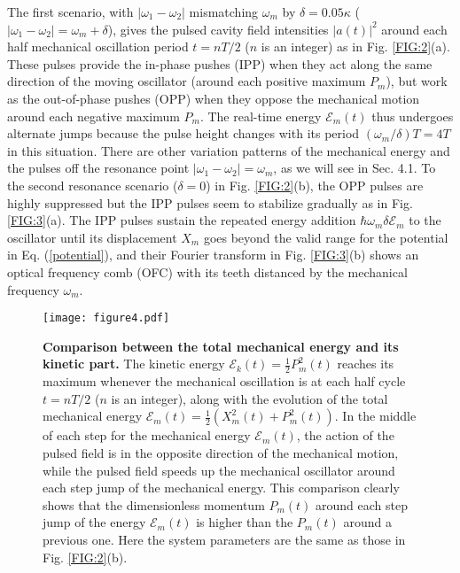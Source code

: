 \documentclass[a4paper,fleqn]{cas-dc}
\begin{document}
The first scenario, with $|\omega_1-\omega_2|$ mismatching $\omega_m$ by $\delta=0.05\kappa$ ($|\omega_1-\omega_2|=\omega_m+\delta$), 
gives the pulsed cavity field intensities $|a(t)|^2$ around each half mechanical oscillation period $t=nT/2$ ($n$ is an integer) as in Fig. \ref{FIG:2}(a). These pulses provide the in-phase pushes (IPP) when they act along the same direction of the moving oscillator (around each positive maximum $P_m$), but work as the out-of-phase pushes (OPP) when they oppose the mechanical motion around each negative maximum $P_m$. The real-time energy $\mathcal{E}_m(t)$ thus undergoes alternate jumps because the pulse height changes with its period $(\omega_m/\delta)T=4T$ in this situation. There are other variation patterns of the mechanical energy and the pulses off the resonance 
point $|\omega_1-\omega_2|=\omega_m$, as we will see in Sec. 4.1. To the second resonance scenario ($\delta=0$) in Fig. \ref{FIG:2}(b), the OPP pulses are highly suppressed but the IPP pulses seem to stabilize gradually as in Fig. \ref{FIG:3}(a). The IPP pulses sustain the repeated energy addition $\hbar\omega_m \delta\mathcal{E}_m$ to the oscillator until its displacement $X_m$ goes beyond the valid range for the potential in Eq. (\ref{potential}), and their Fourier transform in Fig. \ref{FIG:3}(b) shows an optical frequency comb (OFC) with its teeth distanced by the mechanical frequency $\omega_m$.  

\begin{figure}
	\centering
		\texttt{[image: figure4.pdf]}
	\caption{{\bf Comparison between the total mechanical energy and its kinetic part.} The kinetic energy $\mathcal{E}_k(t)=\frac{1}{2}P_m^2(t)$ reaches its maximum whenever the mechanical oscillation is at each half cycle $t=nT/2$ ($n$ is an integer), along with the evolution of the total mechanical energy $\mathcal{E}_m(t)=\frac{1}{2}\left(X_m^2(t)+P_m^2(t)\right)$. In the middle of each step for the mechanical energy $\mathcal{E}_m(t)$, the action of the pulsed field is in the opposite direction of the mechanical motion, while the pulsed field speeds up the mechanical oscillator around each step jump of the mechanical energy. This comparison clearly shows that the dimensionless momentum $P_m(t)$ around each step jump of the energy $\mathcal{E}_m(t)$ is higher than the $P_m(t)$ around a previous one. Here the system parameters are the same as those in Fig. \ref{FIG:2}(b).}
	\label{FIG:4}
\end{figure}
\end{document}
